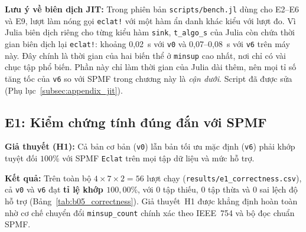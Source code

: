 \textbf{Lưu ý về biên dịch JIT:} Trong phiên bản \texttt{scripts/bench.jl} dùng cho E2--E6 và E9, lượt làm nóng gọi \texttt{eclat!} với một hàm ẩn danh khác kiểu với lượt đo. Vì Julia biên dịch riêng cho từng kiểu hàm \texttt{sink}, \texttt{t\_algo\_s} của Julia còn chứa thời gian biên dịch lại \texttt{eclat!}: khoảng 0,02~s với \texttt{v0} và 0,07--0,08~s với \texttt{v6} trên máy này. Đây chính là thời gian của hai biến thể ở \texttt{minsup} cao nhất, nơi chỉ có vài chục tập phổ biến. Phần này chỉ làm thời gian của Julia dài thêm, nên mọi tỉ số tăng tốc của \texttt{v6} so với SPMF trong chương này là \emph{cận dưới}. Script đã được sửa (Phụ lục~\ref{subsec:appendix_jit}).

\subsection{E1: Kiểm chứng tính đúng đắn với SPMF}
\label{subsec:exp_e1}

\textbf{Giả thuyết (H1):} Cả bản cơ bản (\texttt{v0}) lẫn bản tối ưu mặc định (\texttt{v6}) phải khớp tuyệt đối $100\%$ với SPMF \texttt{Eclat} trên mọi tập dữ liệu và mức hỗ trợ.

\textbf{Kết quả:} Trên toàn bộ $4 \times 7 \times 2 = 56$ lượt chạy (\texttt{results/e1\_correctness.csv}), cả \texttt{v0} và \texttt{v6} đạt \textbf{tỉ lệ khớp $100{,}00\%$}, với 0 tập thiếu, 0 tập thừa và 0 sai lệch độ hỗ trợ (Bảng~\ref{tab:b05_correctness}). Giả thuyết~H1 được khẳng định hoàn toàn nhờ cơ chế chuyển đổi \texttt{minsup\_count} chính xác theo IEEE~754 và bộ đọc chuẩn SPMF.

\begin{table}[!t]
\centering
\caption{Tổng hợp kiểm chứng tính đúng đắn E1 giữa \texttt{EclatFIM} (\texttt{v0}, \texttt{v6}) và SPMF \texttt{Eclat} trên 7 mức \texttt{minsup} mỗi tập (Bảng~B05).}
\label{tab:b05_correctness}
\scriptsize
{}
\end{table}

